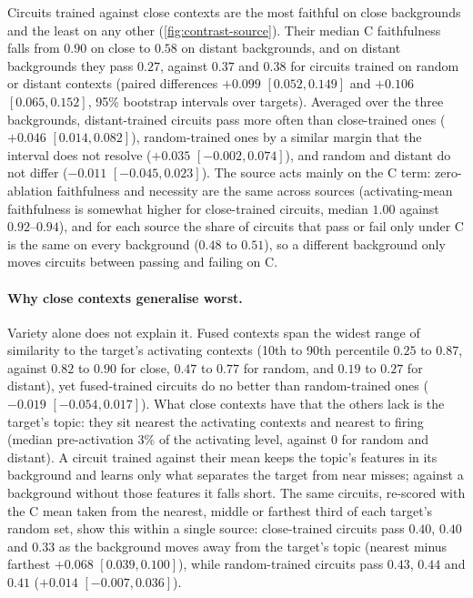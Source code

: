 \documentclass[10pt]{article}
\begin{document}
Circuits trained against close contexts are the most faithful on close backgrounds and the least on any other (\cref{fig:contrast-source}).
Their median C faithfulness falls from $0.90$ on close to $0.58$ on distant backgrounds, and on distant backgrounds they pass $0.27$, against $0.37$ and $0.38$ for circuits trained on random or distant contexts (paired differences $+0.099$ $[0.052, 0.149]$ and $+0.106$ $[0.065, 0.152]$, 95\% bootstrap intervals over targets).
Averaged over the three backgrounds, distant-trained circuits pass more often than close-trained ones ($+0.046$ $[0.014, 0.082]$), random-trained ones by a similar margin that the interval does not resolve ($+0.035$ $[-0.002, 0.074]$), and random and distant do not differ ($-0.011$ $[-0.045, 0.023]$).
The source acts mainly on the C term: zero-ablation faithfulness and necessity are the same across sources (activating-mean faithfulness is somewhat higher for close-trained circuits, median $1.00$ against $0.92$--$0.94$), and for each source the share of circuits that pass or fail only under C is the same on every background ($0.48$ to $0.51$), so a different background only moves circuits between passing and failing on C.

\paragraph{Why close contexts generalise worst.}
Variety alone does not explain it.
Fused contexts span the widest range of similarity to the target's activating contexts (10th to 90th percentile $0.25$ to $0.87$, against $0.82$ to $0.90$ for close, $0.47$ to $0.77$ for random, and $0.19$ to $0.27$ for distant), yet fused-trained circuits do no better than random-trained ones ($-0.019$ $[-0.054, 0.017]$).
What close contexts have that the others lack is the target's topic: they sit nearest the activating contexts and nearest to firing (median pre-activation $3\%$ of the activating level, against $0$ for random and distant).
A circuit trained against their mean keeps the topic's features in its background and learns only what separates the target from near misses; against a background without those features it falls short.
The same circuits, re-scored with the C mean taken from the nearest, middle or farthest third of each target's random set, show this within a single source: close-trained circuits pass $0.40$, $0.40$ and $0.33$ as the background moves away from the target's topic (nearest minus farthest $+0.068$ $[0.039, 0.100]$), while random-trained circuits pass $0.43$, $0.44$ and $0.41$ ($+0.014$ $[-0.007, 0.036]$).
\end{document}
